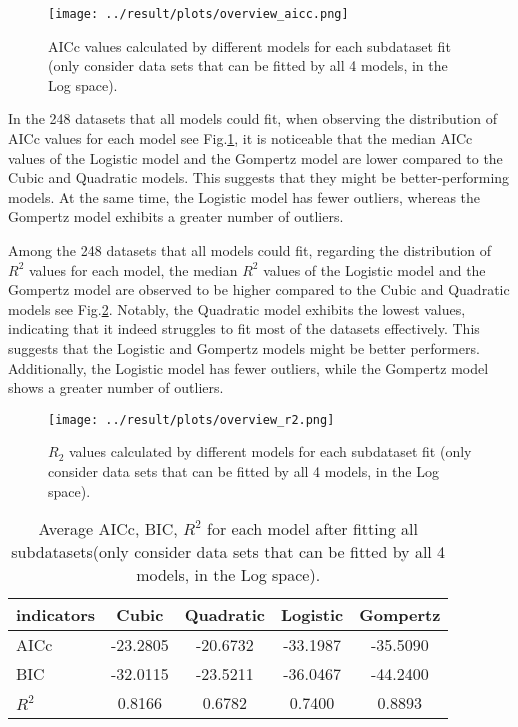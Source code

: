 \documentclass[11pt]{article}
\begin{document}
\begin{linenumbers}
        \begin{figure}[ht!]
            \centering
            \texttt{[image: ../result/plots/overview\_aicc.png]}
            \caption{AICc values calculated by different models for each subdataset fit (only consider data sets that can be fitted by all 4 models, in the Log space).}
            \label{fig:overview_aicc}
        \end{figure}        
In the 248 datasets that all models could fit, when observing the distribution of AICc values for each model see Fig.\ref{fig:overview_aicc}, it is noticeable that the median AICc values of the Logistic model and the Gompertz model are lower compared to the Cubic and Quadratic models. This suggests that they might be better-performing models. At the same time, the Logistic model has fewer outliers, whereas the Gompertz model exhibits a greater number of outliers.

Among the 248 datasets that all models could fit, regarding the distribution of $R^2$ values for each model, the median $R^2$ values of the Logistic model and the Gompertz model are observed to be higher compared to the Cubic and Quadratic models see Fig.\ref{fig:r_2}. Notably, the Quadratic model exhibits the lowest values, indicating that it indeed struggles to fit most of the datasets effectively. This suggests that the Logistic and Gompertz models might be better performers. Additionally, the Logistic model has fewer outliers, while the Gompertz model shows a greater number of outliers.
        \begin{figure}[ht!]
            \centering
            \texttt{[image: ../result/plots/overview\_r2.png]}
            \caption{$R_2$ values calculated by different models for each subdataset fit (only consider data sets that can be fitted by all 4 models, in the Log space).}
            \label{fig:r_2}
        \end{figure}
                
\begin{table}[ht]
    \centering
    \caption{Average AICc, BIC, $R^2$ for each model after fitting all subdatasets(only consider data sets that can be fitted by all 4 models, in the Log space).}
    \begin{tabular}{lcccc} %
    \toprule
    indicators & Cubic & Quadratic & Logistic & Gompertz \\
    \midrule
    AICc & -23.2805 & -20.6732 & -33.1987 & -35.5090 \\
    BIC & -32.0115 & -23.5211 & -36.0467 & -44.2400 \\
    $R^2$ & 0.8166 & 0.6782 & 0.7400 & 0.8893 \\
    \bottomrule
    \end{tabular}
    \label{tab:mean}
\end{table}


\end{linenumbers}
\end{document}
